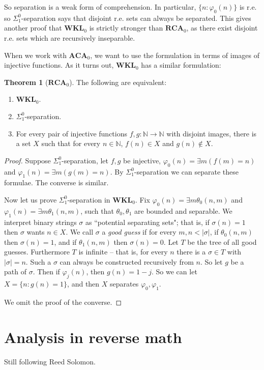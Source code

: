 \documentclass[12pt]{book}
\newcommand{\NN}{\mathbb{N}}
\newcommand{\ACA}{\mathbf{ACA}}
\newcommand{\RCA}{\mathbf{RCA}}
\newcommand{\WKL}{\mathbf{WKL}}
\newcommand{\dfn}[1]{\emph{#1}\index{#1}}
\theoremstyle{definition}
\newtheorem{theorem}{Theorem}[chapter]
\begin{document}
So separation is a weak form of comprehension.
In particular, $\{n: \varphi_0(n)\}$ is r.e. so $\Sigma_1^0$-separation says that disjoint r.e. sets can always be separated.
This gives another proof that $\WKL_0$ is strictly stronger than $\RCA_0$, as there exist disjoint r.e. sets which are recursively inseparable.

When we work with $\ACA_0$, we want to use the formulation in terms of images of injective functions.
As it turns out, $\WKL_0$ has a similar formulation:

\begin{theorem}[$\RCA_0$]
The following are equivalent:
\begin{enumerate}
\item $\WKL_0$.
\item $\Sigma_1^0$-separation.
\item For every pair of injective functions $f,g: \NN \to \NN$ with disjoint images, there is a set $X$ such that for every $n \in \NN$, $f(n) \in X$ and $g(n) \notin X$.
\end{enumerate}
\end{theorem}
\begin{proof}
Suppose $\Sigma_1^0$-separation, let $f,g$ be injective, $\varphi_0(n) = \exists m(f(m) = n)$ and $\varphi_1(n) = \exists m(g(m) = n)$.
By $\Sigma_1^0$-separation we can separate these formulae.
The converse is similar.

Now let us prove $\Sigma_1^0$-separation in $\WKL_0$.
Fix $\varphi_0(n) = \exists m \theta_0(n, m)$ and $\varphi_1(n) = \exists m \theta_1(n, m)$, such that $\theta_0,\theta_1$ are bounded and separable.
We interpret binary strings $\sigma$ as ``potential separating sets"; that is, if $\sigma(n) = 1$ then $\sigma$ wants $n \in X$.
We call $\sigma$ a \dfn{good guess} if for every $m, n < |\sigma|$, if $\theta_0(n, m)$ then $\sigma(n) = 1$, and if $\theta_1(n, m)$ then $\sigma(n) = 0$.
Let $T$ be the tree of all good guesses.
Furthermore $T$ is infinite -- that is, for every $n$ there is a $\sigma \in T$ with $|\sigma| = n$.
Such a $\sigma$ can always be constructed recursively from $n$.
So let $g$ be a path of $\sigma$. Then if $\varphi_j(n)$, then $g(n) = 1 - j$.
So we can let $X = \{n: g(n) = 1\}$, and then $X$ separates $\varphi_0,\varphi_1$.

We omit the proof of the converse.
\end{proof}

\chapter{Analysis in reverse math}
Still following Reed Solomon.
\end{document}

